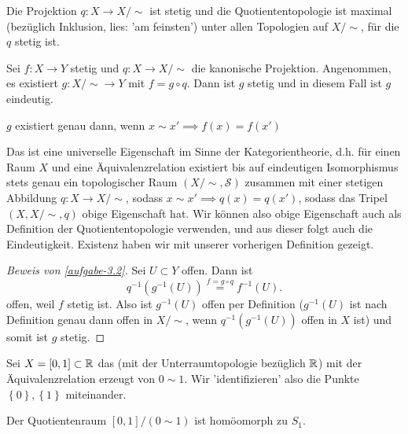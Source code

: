 \begin{remark}
    Die Projektion $q: X \to  X / \sim $ ist stetig und die Quotiententopologie ist maximal (bezüglich Inklusion, lies: 'am feinsten') unter allen Topologien auf $X / \sim $, für die $q$ stetig ist.
\end{remark}
\begin{theorem}\label{thm:universelle-eigenschaft-der-quotiententopologie}
    Sei $f : X \to  Y$ stetig und $q : X \to  X / \sim $ die kanonische Projektion. Angenommen, es existiert $g : X / \sim \to  Y$ mit $f = g \circ  q$. Dann ist $g$ stetig und in diesem Fall ist $g$ eindeutig. \\
    \begin{minipage}{\textwidth}
    \centering    
    \end{minipage}
\end{theorem}
\begin{remark}
    $g$ existiert genau dann, wenn  $x \sim x' \implies f(x) = f(x')$
\end{remark}
\begin{trivial*}
    Das ist eine universelle Eigenschaft im Sinne der Kategorientheorie, d.h. für einen Raum $X$ und eine Äquivalenzrelation existiert bis auf eindeutigen Isomorphismus stets genau ein topologischer Raum $(X / \sim  , \mathcal{S})$ zusammen mit einer stetigen Abbildung $q : X \to  X / \sim $, sodass $x\sim x' \implies q(x) = q(x')$, sodass das Tripel $(X, X / \sim , q)$ obige Eigenschaft hat. Wir können also obige Eigenschaft auch als Definition der Quotiententopologie verwenden, und aus dieser folgt auch die Eindeutigkeit. Existenz haben wir mit unserer vorherigen Definition gezeigt.
\end{trivial*}

\begin{proof}[Beweis von \autoref{aufgabe-3.2}]
    Sei $U\subset Y$ offen. Dann ist
    \[
        q^{-1}(g^{-1}(U)) \stackrel{f = g \circ  q}{=} f^{-1}(U)
    .\] 
    offen, weil $f$ stetig ist. Also ist  $g^{-1}(U)$ offen per Definition ($g^{-1}(U)$ ist nach Definition genau dann offen in $X / \sim $, wenn $q^{-1}(g^{-1}(U))$ offen in $X$ ist) und somit ist $g$ stetig. 
\end{proof}
\begin{dexample}
Sei $X = [0,1]\subset \mathbb{R}$ das  (mit der Unterraumtopologie bezüglich $\mathbb{R}$) mit der Äquivalenzrelation erzeugt von $0\sim 1$. Wir 'identifizieren' also die Punkte $\left \{0\right\} ,\left \{1\right\} $ miteinander.
\end{dexample}
\begin{theorem}[Kreishomöomorphie]\label{thm:kreis-ist-quotientenraum-von-einheitsintervall}
    Der Quotientenraum $[0,1] / (0\sim 1)$ ist homöomorph zu $S_1$.
\end{theorem}


